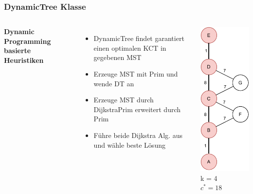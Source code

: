 \documentclass[aspectratio=169]{beamer}
\begin{document}
\begin{frame}
	\frametitle{DynamicTree Klasse}
	\begin{columns}[c] %
		
		\textbf{Dynamic Programming basierte Heuristiken}
		\begin{itemize}
			\item DynamicTree findet garantiert einen optimalen KCT in gegebenen MST
			\item Erzeuge MST mit Prim und wende DT an
			\item Erzeuge MST durch DijkstraPrim erweitert durch Prim
			\item Führe beide Dijkstra Alg. aus und wähle beste Lösung
		\end{itemize}
		\includegraphics[scale=.6]{path_optimal.pdf}
		k = 4\\
		$c^* = 18$
		
		
	\end{columns}
	\end{frame}
	
\end{document}
